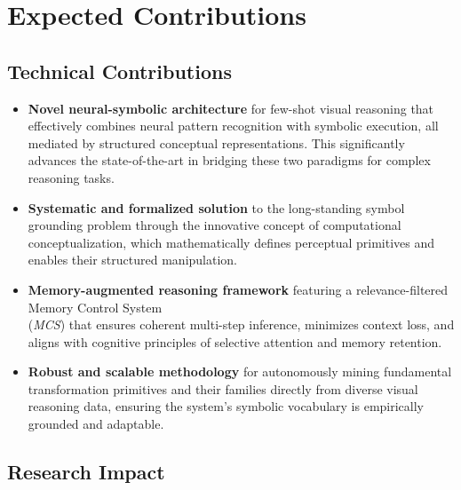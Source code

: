 \documentclass[12pt]{article}
\newcommand{\mcs}{\textit{MCS}}
\begin{document}
\section{Expected Contributions}

\subsection{Technical Contributions}

\begin{itemize}[noitemsep,topsep=0pt]
\item\textbf{Novel neural-symbolic architecture} for few-shot visual reasoning that effectively combines neural pattern recognition with symbolic execution, all mediated by structured conceptual representations. This significantly advances the state-of-the-art in bridging these two paradigms for complex reasoning tasks.
\item\textbf{Systematic and formalized solution} to the long-standing symbol grounding problem through the innovative concept of computational conceptualization, which mathematically defines perceptual primitives and enables their structured manipulation.
\item\textbf{Memory-augmented reasoning framework} featuring a relevance-filtered Memory Control System \\(\mcs{}) that ensures coherent multi-step inference, minimizes context loss, and aligns with cognitive principles of selective attention and memory retention.
\item\textbf{Robust and scalable methodology} for autonomously mining fundamental transformation primitives and their families directly from diverse visual reasoning data, ensuring the system's symbolic vocabulary is empirically grounded and adaptable.
\end{itemize}

\subsection{Research Impact}
\end{document}
